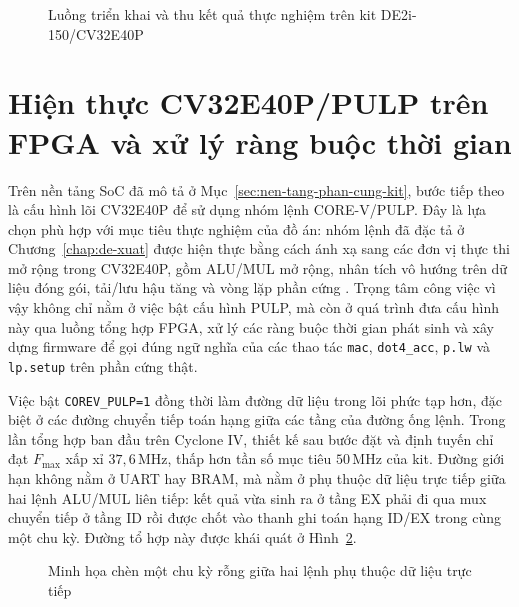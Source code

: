 \documentclass[../DoAn.tex]{subfiles}
\begin{document}
\begin{figure}[H]
    \centering
    \resizebox{0.96\linewidth}{!}{}
    \caption{Luồng triển khai và thu kết quả thực nghiệm trên kit DE2i-150/CV32E40P}
    \label{fig:de2i150-soc-experiment-flow}
\end{figure}

\section{Hiện thực CV32E40P/PULP trên FPGA và xử lý ràng buộc thời gian}
\label{sec:cv32e40p-pulp-timing}

Trên nền tảng SoC đã mô tả ở Mục~\ref{sec:nen-tang-phan-cung-kit}, bước tiếp theo là cấu hình lõi CV32E40P để sử dụng nhóm lệnh CORE-V/PULP. Đây là lựa chọn phù hợp với mục tiêu thực nghiệm của đồ án: nhóm lệnh đã đặc tả ở Chương~\ref{chap:de-xuat} được hiện thực bằng cách ánh xạ sang các đơn vị thực thi mở rộng trong CV32E40P, gồm ALU/MUL mở rộng, nhân tích vô hướng trên dữ liệu đóng gói, tải/lưu hậu tăng và vòng lặp phần cứng \cite{openhw_cv32e40p_um_2024}. Trọng tâm công việc vì vậy không chỉ nằm ở việc bật cấu hình PULP, mà còn ở quá trình đưa cấu hình này qua luồng tổng hợp FPGA, xử lý các ràng buộc thời gian phát sinh và xây dựng firmware để gọi đúng ngữ nghĩa của các thao tác \texttt{mac}, \texttt{dot4\_acc}, \texttt{p.lw} và \texttt{lp.setup} trên phần cứng thật.

Việc bật \texttt{COREV\_PULP=1} đồng thời làm đường dữ liệu trong lõi phức tạp hơn, đặc biệt ở các đường chuyển tiếp toán hạng giữa các tầng của đường ống lệnh. Trong lần tổng hợp ban đầu trên Cyclone IV, thiết kế sau bước đặt và định tuyến chỉ đạt \(F_{\max}\) xấp xỉ \(37{,}6\,\mathrm{MHz}\), thấp hơn tần số mục tiêu \(50\,\mathrm{MHz}\) của kit. Đường giới hạn không nằm ở UART hay BRAM, mà nằm ở phụ thuộc dữ liệu trực tiếp giữa hai lệnh ALU/MUL liên tiếp: kết quả vừa sinh ra ở tầng EX phải đi qua mux chuyển tiếp ở tầng ID rồi được chốt vào thanh ghi toán hạng ID/EX trong cùng một chu kỳ. Đường tổ hợp này được khái quát ở Hình~\ref{fig:fpga-timing-bubble}.

\begin{figure}[H]
    \centering
    \resizebox{0.96\linewidth}{!}{}
    \caption{Minh họa chèn một chu kỳ rỗng giữa hai lệnh phụ thuộc dữ liệu trực tiếp}
    \label{fig:fpga-timing-bubble}
\end{figure}
\end{document}

